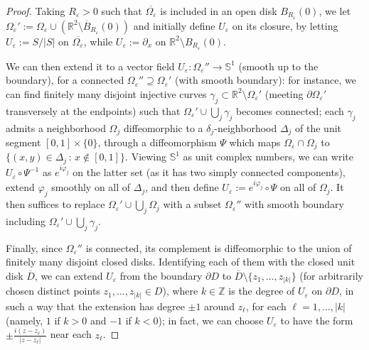 \documentclass[11pt,a4paper]{amsart}
\newcommand{\Z}{\mathbb{Z}}
\newcommand{\R}{\mathbb{R}}
\newcommand{\de}{\partial}
\newcommand{\nin}{\not\in}
\renewcommand{\bar}{\overline}
\renewcommand{\phi}{\varphi}
\theoremstyle{definition}
\renewcommand{\epsilon}{\varepsilon}
\begin{document}
\begin{proof}
Taking $R_\epsilon>0$ such that $\bar{\Omega_\epsilon}$ is included in an open disk $B_{R_\epsilon}(0)$, we let $\Omega_\epsilon':=\Omega_\epsilon\cup(\R^2\setminus\bar B_{R_\epsilon}(0))$ and initially define
$U_\epsilon$ on its closure, by letting
$U_\epsilon:=S/|S|$ on $\bar{\Omega_\epsilon}$,
while $U_\epsilon:=\de_x$ on $\R^2\setminus B_{R_\epsilon}(0)$.

We can then extend it to a vector field $U_\epsilon:\Omega_\epsilon''\to \mathbb{S}^1$ (smooth up to the boundary), for a connected $\Omega_\epsilon''\supseteq\Omega_\epsilon'$ (with smooth boundary): for instance, we can
find finitely many disjoint injective curves $\gamma_j\subset\R^2\setminus\Omega_\epsilon'$ (meeting $\de\Omega_\epsilon'$ transversely at the endpoints) such that $\Omega_\epsilon'\cup\bigcup_j\gamma_j$ becomes connected; each $\gamma_j$ admits a neighborhood $\Omega_j$
diffeomorphic to a $\delta_j$-neighborhood $\Delta_j$ of the unit segment $[0,1]\times\{0\}$,
through a diffeomorphism $\Psi$ which maps $\Omega_\epsilon\cap\Omega_j$ to $\{(x,y)\in\Delta_j\,:\,x\nin[0,1]\}$.
Viewing $\mathbb{S}^1$ as unit complex numbers, we can write $U_\epsilon\circ\Psi^{-1}$ as $e^{i\phi_j}$
on the latter set (as it has two simply connected components), extend $\phi_j$ smoothly on all of $\Delta_j$, and then define $U_\epsilon:=e^{i\phi_j}\circ\Psi$
on all of $\Omega_j$. It then suffices to replace $\Omega_\epsilon'\cup\bigcup_j\Omega_j$ with a
subset $\Omega_\epsilon''$ with smooth boundary including $\Omega_\epsilon'\cup\bigcup_j\gamma_j$.

Finally, since $\Omega_\epsilon''$ is connected, its complement is diffeomorphic to the union of finitely many disjoint closed disks.
Identifying each of them with the closed unit disk $\bar D$, we can extend $U_\epsilon$ from the boundary
$\de D$ to $\bar D\setminus\{z_1,\dots,z_{|k|}\}$
(for arbitrarily chosen distinct points $z_1,\dots,z_{|k|}\in D$),
where $k\in\Z$ is the degree of $U_\epsilon$ on $\de D$,
in such a way that the extension has degree $\pm1$ around $z_\ell$,
for each $\ell=1,\dots,|k|$
(namely, $1$ if $k>0$ and $-1$ if $k<0$); in fact,
we can choose $U_\epsilon$ to have the form $\pm\frac{i(z-z_\ell)}{|z-z_\ell|}$ near each $z_\ell$.
\end{proof}
\end{document}
